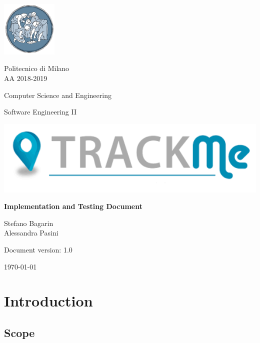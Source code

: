 \documentclass[a4paper,12pt]{report}
\begin{document}
	\begin{titlepage}
		\centering
		\includegraphics[width=0.20\textwidth]{./pictures/logo_polimi.png}\par

		{Politecnico di Milano \\ AA 2018-2019} \par
		\vspace{1.5cm}

		{Computer Science and Engineering}\par
		\Large{Software Engineering II}\par
		\vspace{1.0cm}

		\includegraphics[width=1.00\textwidth]{./pictures/logo_trackme.png}\par
		{\LARGE \textbf{Implementation and Testing Document} \par}
		\vspace{1.0cm}
		{\Large Stefano Bagarin\\ Alessandra Pasini\par}
		\vspace{2cm}
		\vfill

		{\large Document version: 1.0\par}
		{\large \today \par}
	\end{titlepage}

	\tableofcontents

	\chapter{Introduction}
	\label{ch:Introduction}

	\section{Scope}
	
\end{document}
